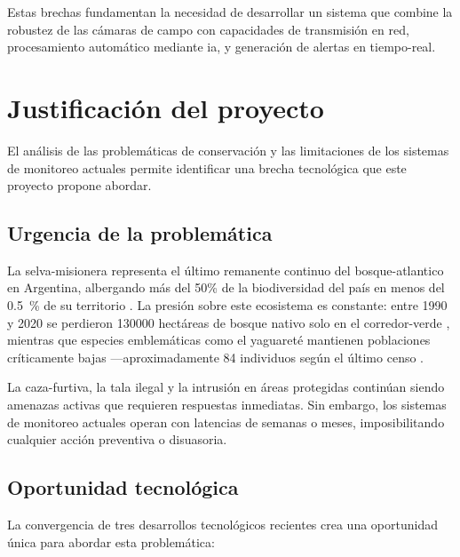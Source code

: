 \documentclass[a4paper, 12pt]{report}
\begin{document}
Estas brechas fundamentan la necesidad de desarrollar un sistema que combine
la robustez de las cámaras de campo con capacidades de transmisión en red,
procesamiento automático mediante \gls{ia}, y generación de alertas en
\gls{tiempo-real}.

\section{Justificación del proyecto}

El análisis de las problemáticas de conservación y las limitaciones de los
sistemas de monitoreo actuales permite identificar una brecha tecnológica
que este proyecto propone abordar.

\subsection{Urgencia de la problemática}

La \gls{selva-misionera} representa el último remanente continuo del
\gls{bosque-atlantico} en Argentina, albergando más del 50\% de la biodiversidad
del país en menos del \qty{0.5}{\percent} de su territorio \cite{dibitetti2003yaguarete}. La
presión sobre este ecosistema es constante: entre 1990 y 2020 se perdieron
\num{130000} hectáreas de bosque nativo solo en el \gls{corredor-verde}
\cite{fauba2024corredorverde}, mientras que especies emblemáticas como el
yaguareté mantienen poblaciones críticamente bajas ---aproximadamente \num{84}
individuos según el último censo \cite{vidasilvestre2024censo}.

La \gls{caza-furtiva}, la tala ilegal y la intrusión en áreas protegidas
continúan siendo amenazas activas que requieren respuestas inmediatas. Sin
embargo, los sistemas de monitoreo actuales operan con latencias de semanas
o meses, imposibilitando cualquier acción preventiva o disuasoria.

\subsection{Oportunidad tecnológica}

La convergencia de tres desarrollos tecnológicos recientes crea una oportunidad
única para abordar esta problemática:
\end{document}
